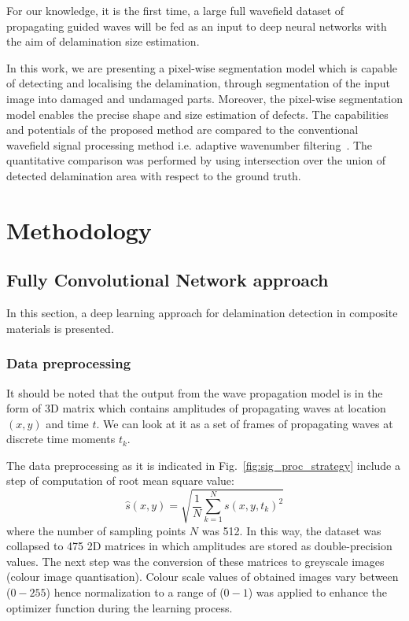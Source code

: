 \documentclass[preprint,9pt]{elsarticle}
\begin{document}
For our knowledge, it is the first time, a large full wavefield dataset of propagating guided waves will be fed as an input to deep neural networks with the aim of delamination size estimation.

In this work, we are presenting a pixel-wise segmentation model which is capable of detecting and localising the delamination, through segmentation of the input image into damaged and undamaged parts.
Moreover, the pixel-wise segmentation model enables the precise shape and size estimation of defects.
The capabilities and potentials of the proposed method are compared to the conventional wavefield signal processing method i.e. adaptive wavenumber filtering~\cite{Kudela2015,Radzienski2019}.
The quantitative comparison was performed by using intersection over the union of detected delamination area with respect to the ground truth. 
\section{Methodology}



\subsection{Fully Convolutional Network approach}
In this section, a deep learning approach for delamination detection in composite materials is presented. 
\subsubsection{Data preprocessing}
It should be noted that the output from the wave propagation model is in the form of 3D matrix which contains amplitudes of propagating waves at location \((x, y)\) and time \(t\). We can look at it as a set of frames of propagating waves at discrete time moments \(t_k\).

The data preprocessing as it is indicated in Fig.~\ref{fig:sig_proc_strategy} include a step of computation of root mean square value:
\begin{equation}
	\hat{s}(x,y) = \sqrt{\frac{1}{N}\sum_{k=1}^{N} s(x,y,t_k)^2}
	\label{eq:rms}
\end{equation}
where the number of sampling points \(N\) was 512.
In this way, the dataset was collapsed to 475 2D matrices in which amplitudes are stored as double-precision values.
The next step was the conversion of these matrices to greyscale images (colour image quantisation).
Colour scale values of obtained images vary between (\(0 - 255\)) hence normalization
to a range of (\(0-1\)) was applied to enhance the optimizer function during the learning process. 
	
\end{document}
